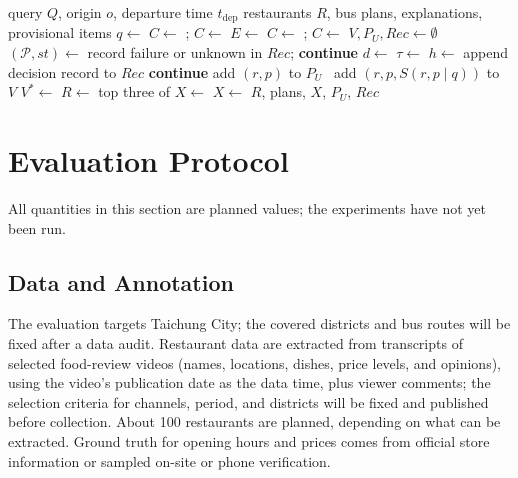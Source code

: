 \documentclass[conference]{IEEEtran}
\begin{document}
\begin{algorithm}[t]
\caption{Context-First Recommendation with Bus Analysis}
\label{alg:recommend}
\footnotesize
\begin{algorithmic}[1]
\Require query $Q$, origin $o$, departure time $t_{\mathrm{dep}}$
\Ensure restaurants $R$, bus plans, explanations, provisional items
\State $q\gets$ 
 \Return {} \EndIf
\State $C\gets$ ; $C\gets$ 
 \Return {} \EndIf
\State $E\gets$ 
\State $C\gets$ ; $C\gets$ 
\State $V,P_U,\mathit{Rec}\gets\emptyset$
  \State $(\mathcal{P},\mathit{st})\gets$ 
    \State record failure or unknown in $\mathit{Rec}$; \textbf{continue}
  \EndIf
    \State $d\gets$ 
    \State $\tau\gets$ 
    \State $h\gets$ 
    \State append decision record to $\mathit{Rec}$
     \textbf{continue}
     add $(r,p)$ to $P_U$
    \Else\ add $(r,p,S(r,p\mid q))$ to $V$
    \EndIf
  \EndFor
\EndFor
\State $V^*\gets$ 
\State $R\gets$ top three of 
 \Return {} \EndIf
\State $X\gets$ 
 $X\gets$  \EndIf
\State \Return $R$, plans, $X$, $P_U$, $\mathit{Rec}$
\end{algorithmic}
\end{algorithm}

\section{Evaluation Protocol}\label{sec:eval}

All quantities in this section are planned values; the experiments have not yet been run.

\subsection{Data and Annotation}
The evaluation targets Taichung City; the covered districts and bus routes will be fixed after a data audit. Restaurant data are extracted from transcripts of selected food-review videos (names, locations, dishes, price levels, and opinions), using the video's publication date as the data time, plus viewer comments; the selection criteria for channels, period, and districts will be fixed and published before collection. About 100 restaurants are planned, depending on what can be extracted. Ground truth for opening hours and prices comes from official store information or sampled on-site or phone verification.
\end{document}
